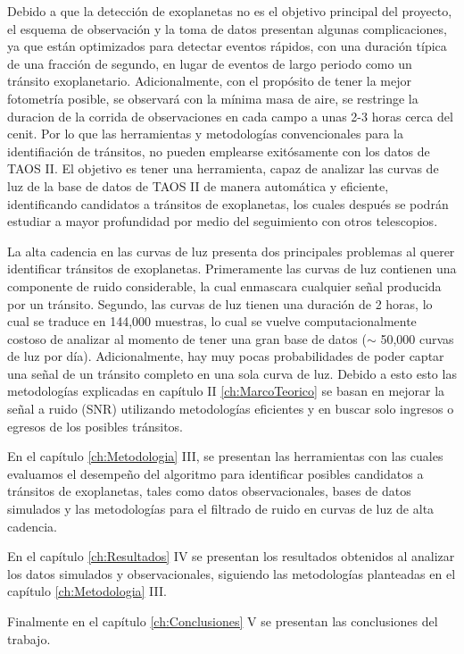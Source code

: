 Debido a que la detección de exoplanetas no es el objetivo principal del proyecto, el esquema de observación y la toma de datos presentan algunas complicaciones, ya que están optimizados para detectar eventos rápidos, con una duración típica de una fracción de segundo, en lugar de eventos de largo periodo como un tránsito exoplanetario. Adicionalmente, con el propósito de tener la mejor fotometría posible, se observará con la mínima masa de aire, se restringe la duracion de la corrida de observaciones en cada campo a unas 2-3 horas cerca del cenit. Por lo que las herramientas y metodologías convencionales para la identifiación de tránsitos, no pueden emplearse exitósamente con los datos de TAOS II. El objetivo es tener una herramienta, capaz de analizar las curvas de luz de la base de datos de TAOS II de manera automática y eficiente, identificando candidatos a tránsitos de exoplanetas, los cuales después se podrán estudiar a mayor profundidad por medio del seguimiento con otros telescopios.

La alta cadencia en las curvas de luz presenta dos principales problemas al querer identificar tránsitos de exoplanetas. Primeramente las curvas de luz contienen una componente de ruido considerable, la cual enmascara cualquier señal producida por un tránsito. Segundo, las curvas de luz tienen una duración de 2 horas, lo cual se traduce en 144,000 muestras, lo cual se vuelve computacionalmente costoso de analizar al momento de tener una gran base de datos ($\sim$ 50,000 curvas de luz por día). Adicionalmente, hay muy pocas probabilidades de poder captar una señal de un tránsito completo en una sola curva de luz. Debido a esto esto las metodologías explicadas en capítulo II \ref{ch:MarcoTeorico} se basan en mejorar la señal a ruido (SNR) utilizando metodologías eficientes y en buscar solo ingresos o egresos de los posibles tránsitos.

En el capítulo \ref{ch:Metodologia} III, se presentan las herramientas con las cuales evaluamos el desempeño del algoritmo para identificar posibles candidatos a tránsitos de exoplanetas, tales como datos observacionales, bases de datos simulados y las metodologías para el filtrado de ruido en curvas de luz de alta cadencia.

En el capítulo \ref{ch:Resultados} IV se presentan los resultados obtenidos al analizar los datos simulados y observacionales, siguiendo las metodologías planteadas en el capítulo \ref{ch:Metodologia} III.

Finalmente en el capítulo \ref{ch:Conclusiones} V se presentan las conclusiones del trabajo.














